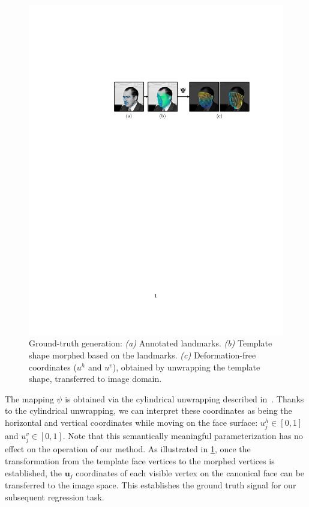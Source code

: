 %
\begin{figure}
\centering
\includegraphics[trim={7.2cm 18.3cm 2.7cm 6.5cm}, clip, width=\linewidth]{resources/Human_Poses/Obtaining_GT}
\caption{Ground-truth generation: \emph{(a)} Annotated landmarks. \emph{(b)} Template shape morphed based on the landmarks. \emph{(c)} Deformation-free coordinates (${u^h}$ and ${u^v}$), obtained by unwrapping the template shape, transferred to image domain. }

\label{fig:GT}
\end{figure}

The mapping $\psi$ is obtained via the cylindrical unwrapping described in~\cite{booth2014optimal}. Thanks to the cylindrical unwrapping, we can interpret these coordinates as being the horizontal and vertical coordinates while moving on the face surface: ${u}_j^h \in [0,1]$ and ${u}_j^v \in [0,1]$. Note that this semantically meaningful parameterization has no effect on the operation of our method.
As  illustrated in \ref{fig:GT}, once the transformation from the template face vertices to the morphed vertices is established, the  $\bm{u}_j$ coordinates of each visible vertex on the canonical face can be transferred to the image space. This establishes the ground truth signal for our subsequent regression task.


